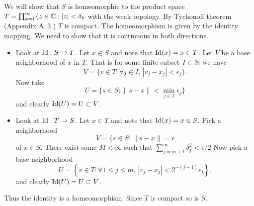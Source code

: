 \begin{enumerate}
\iffalse
Let $G$ be an open covering of $S$.
For each $n$, the $G$ covering of $S$ is also covering of \(K_n\).
Let \(G_n \subset G\) a finite subcovering of \(K_n\).
We may also assume \(G_n \subset G_{n+1}\)
(otherwise, we simply annex \(G_n\) to \(G_{n+1}\)).
Suppose by negation that $S$ is \emph{not} compact.
Then \(\cup G_n \subsetneq S\) for each $n$.
Pick \(x_n \in S \setminus \cup G_n\).
We will now find a subsequence of \((x_n)_{n\in\N}\) that converges in $S$,
by getting subsequences that converge on projections on \(K_n\)'s.
Moving to double indexing, we put \(x_{0,n} = x_n\).
By induction assume that for $k$ the sequence \((x_{k,n})_{n\in\N}\)
is defined.
Pick a subsequences \((x_{k+1,n})_{n\in\N}\) whose projection on \(K_{k+1}\)
converges. Taking the diagonal subsequences, let \(y_n = x_{n,n}\).
Its projection (\(\langle\cdot,u_k\rangle\))
on \(K_k\) converges for all $k$.
Moreover its limit \(t = \sum_{k=1}^\infty \langle x,u_k \rangle u_k\)
converges in $S$ since \(\|t\| \leq \sum_{k=1}^\infty \delta_k^2\).
Thus \(t\in S\). Pick \(V\in G\) such that \(t\in V\).
There exist \(0<r\in\R\) such that \(B(t,r) \subset V\).
Let $m$ be such that
\begin{equation*}
\sum_{j=m+1}^\infty \delta_j^2 < r
\end{equation*}
Let \(t'\) be the projection of $t$ on \(H_m\).
So now \(t' \in K_n\).
\mldots
\fi

We will show that $S$ is homeomorphic to
the product space \(T = \prod_{k=1}^\infty \{z\in \mathbb{C}: |z|<\delta_k\)
with the weak topology.
By Tychonoff theorem (Appendix A~3 \cite{RudinFA79}) $T$ is compact.
The homeomorphism is given by the identity mapping. We need to show that
it is continuous in both directions.
\begin{itemize}
 \item
 Look at \(\mathop{\rm Id}\nolimits: S \to T\). Let \(x\in S\) and note that \(\mathop{\rm Id}\nolimits(x) = x\in T\).
 Let $V$ be a base neighborhood of $x$ in $T$. That is for some finite
 subset \(I \subset \mathbb{N}\) we have
 \begin{equation*}
 V = \{v\in T: \forall j\in I,\, |v_j - x_j| < \epsilon_j\}.
 \end{equation*}
 Now take
 \begin{equation*}
 U = \{s\in S: \|s-x\| < \min_{j\in J} \epsilon_j\}
 \end{equation*}
 and clearly \(\mathop{\rm Id}\nolimits(U) = U \subset V\).

 \item
 Look at \(\mathop{\rm Id}\nolimits: T \to S\).
 Let \(x\in T\) and note that \(\mathop{\rm Id}\nolimits(x) = x\in S\).
 Pick a neighborhood
 \begin{equation*}
 V = \{s\in S: \|s-x\| = \epsilon
 \end{equation*}
 of \(x\in S\).
 There exist some \(M<\infty\) such that
\(\sum_{j=m+1}^\infty \delta_j^2 < \epsilon/2\)
 Now pick a base neighborhood
 \begin{equation*}
 U = \left\{v\in T:
     \forall 1\leq j\leq m,\, |v_j - x_j| < 2^{-(j+1)}\epsilon_j\right\}.
 \end{equation*}
 and clearly \(\mathop{\rm Id}\nolimits(U) = U \subset V\).
\end{itemize}
Thus the identity is a homeomorphism. Since $T$ is compact so is $S$.



\end{enumerate}

